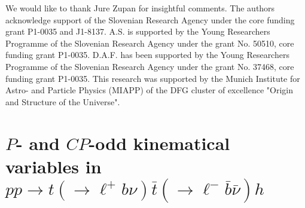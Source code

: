 \documentclass[11pt,a4paper]{article}
\begin{document}
\begin{acknowledgments}
We would like to thank Jure Zupan for insightful comments. The authors acknowledge support of the Slovenian Research Agency under the core funding grant P1-0035 and J1-8137. A.S. is supported by the Young Researchers Programme of the Slovenian Research Agency under the grant No. 50510, core funding grant P1-0035. D.A.F. has been supported by the Young Researchers Programme of the Slovenian Research Agency under the grant No. 37468, core funding grant P1-0035. This research was supported by the Munich Institute for Astro- and Particle Physics (MIAPP) of the DFG cluster of excellence "Origin and Structure of the Universe".
\end{acknowledgments}













\appendix

\section{$P$- and $CP$-odd kinematical variables in $pp \to t (\to \ell^+ b \nu) \bar t(\to \ell^- \bar b \bar\nu) h$}
\label{app:tthVars}
\end{document}
